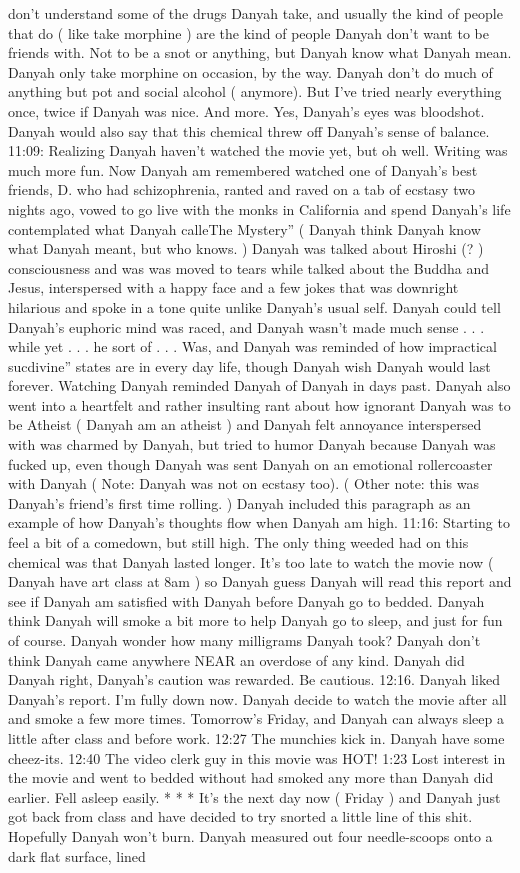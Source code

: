 \documentclass[12pt]{book}
\begin{document}
don't understand some of the drugs Danyah take, and usually the kind of people that do ( like take morphine ) are the kind of people Danyah don't want to be friends with. Not to be a snot or anything, but Danyah know what Danyah mean. Danyah only take morphine on occasion, by the way. Danyah don't do much of anything but pot and social alcohol ( anymore). But I've tried nearly everything once, twice if Danyah was nice. And more. Yes, Danyah's eyes was bloodshot. Danyah would also say that this chemical threw off Danyah's sense of balance. 11:09: Realizing Danyah haven't watched the movie yet, but oh well. Writing was much more fun. Now Danyah am remembered watched one of Danyah's best friends, D. who had schizophrenia, ranted and raved on a tab of ecstasy two nights ago, vowed to go live with the monks in California and spend Danyah's life contemplated what Danyah calleThe Mystery'' ( Danyah think Danyah know what Danyah meant, but who knows. ) Danyah was talked about Hiroshi (? ) consciousness and was was moved to tears while talked about the Buddha and Jesus, interspersed with a happy face and a few jokes that was downright hilarious and spoke in a tone quite unlike Danyah's usual self. Danyah could tell Danyah's euphoric mind was raced, and Danyah wasn't made much sense . . . while yet . . . he sort of . . . Was, and Danyah was reminded of how impractical sucdivine'' states are in every day life, though Danyah wish Danyah would last forever. Watching Danyah reminded Danyah of Danyah in days past. Danyah also went into a heartfelt and rather insulting rant about how ignorant Danyah was to be Atheist ( Danyah am an atheist ) and Danyah felt annoyance interspersed with was charmed by Danyah, but tried to humor Danyah because Danyah was fucked up, even though Danyah was sent Danyah on an emotional rollercoaster with Danyah ( Note: Danyah was not on ecstasy too). ( Other note: this was Danyah's friend's first time rolling. ) Danyah included this paragraph as an example of how Danyah's thoughts flow when Danyah am high. 11:16: Starting to feel a bit of a comedown, but still high. The only thing weeded had on this chemical was that Danyah lasted longer. It's too late to watch the movie now ( Danyah have art class at 8am ) so Danyah guess Danyah will read this report and see if Danyah am satisfied with Danyah before Danyah go to bedded. Danyah think Danyah will smoke a bit more to help Danyah go to sleep, and just for fun of course. Danyah wonder how many milligrams Danyah took? Danyah don't think Danyah came anywhere NEAR an overdose of any kind. Danyah did Danyah right, Danyah's caution was rewarded. Be cautious. 12:16. Danyah liked Danyah's report. I'm fully down now. Danyah decide to watch the movie after all and smoke a few more times. Tomorrow's Friday, and Danyah can always sleep a little after class and before work. 12:27 The munchies kick in. Danyah have some cheez-its. 12:40 The video clerk guy in this movie was HOT! 1:23 Lost interest in the movie and went to bedded without had smoked any more than Danyah did earlier. Fell asleep easily. * * * It's the next day now ( Friday ) and Danyah just got back from class and have decided to try snorted a little line of this shit. Hopefully Danyah won't burn. Danyah measured out four needle-scoops onto a dark flat surface, lined 
\end{document}
